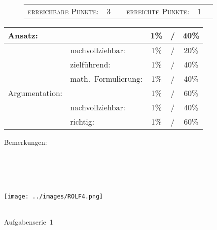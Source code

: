 \documentclass{article}
\begin{document}
\vspace{-0.5cm}
\begin{figure}[h!]
\begin{tabular}{crcrcr}
\textsc{erreichbare Punkte:} &3& & \textsc{erreichte Punkte:} &1
\end{tabular}
\end{figure}
\vspace{-0.1cm}
\begin{minipage}[t]{0.6\textwidth}
\flushleft
\begin{tabular}{l|lccc}
Ansatz:& &1\%&/&40\%\\\hline
&nachvollziehbar:&1\%&/&20\%\\
&zielf{\"u}hrend:&1\%&/&40\%\\
&math.~Formulierung:& 1\%&/&40\%\\\hline\hline
Argumentation:& &1\%&/&60\%\\\hline
&nachvollziehbar:&1\%&/&40\%\\
&richtig:&1\%&/&60\%\\\hline
\end{tabular}
\end{minipage}
\hfill
\begin{minipage}[t]{0.4\textwidth}
	\vspace{-1.75cm}
	Bemerkungen:\\\vspace*{0.2cm}
	\underline{\hspace{0.75\textwidth}}\\\vspace*{0.2cm}
	\underline{\hspace{0.75\textwidth}}
	\\\vspace*{0.2cm}
	\underline{\hspace{0.75\textwidth}}
	\\\vspace*{0.2cm}
	\underline{\hspace{0.75\textwidth}}
	\\\vspace*{0.2cm}
	\underline{\hspace{0.75\textwidth}}
\end{minipage}
	\vspace{0.5cm}\clearpage\vspace*{-2cm}
\parbox{4cm}{\texttt{[image: ../images/ROLF4.png]}}
\parbox{10.6cm}{ \\ Aufgabenserie~1  \\ \vspace*{-.5cm} }
\end{document}
